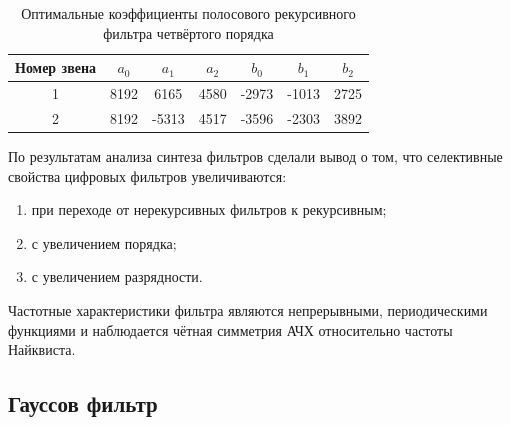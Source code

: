 \documentclass[a4paper,14pt]{extarticle}
\begin{document}
\begin{table}[H]
\centering
\caption{Оптимальные  коэффициенты  полосового  рекурсивного  фильтра  четвёртого порядка}
\vspace{0.5em}
\begin{tabular}{|c|c|c|c|c|c|c|}
\hline
Номер звена & $a_0$ & $a_1$ & $a_2$ & $b_0$ & $b_1$ & $b_2$ \\ \hline
1           & 8192    & 6165    & 4580    & -2973   & -1013   & 2725    \\ \hline
2           & 8192    & -5313   & 4517    & -3596   & -2303   & 3892    \\ \hline
\end{tabular}
\end{table}
По результатам анализа синтеза фильтров сделали вывод о том, что селективные свойства цифровых фильтров увеличиваются:
\begin{enumerate}
  \vspace{-0.6em}
  \item при переходе от нерекурсивных фильтров к рекурсивным;\\[-1.8em]
  \item с увеличением порядка;\\[-1.8em]
  \item с увеличением разрядности.\\[-1.8em]
\end{enumerate}

Частотные характеристики фильтра являются непрерывными, периодическими функциями и наблюдается чётная симметрия АЧХ относительно частоты Найквиста.

\subsection{Гауссов фильтр}
\end{document}
